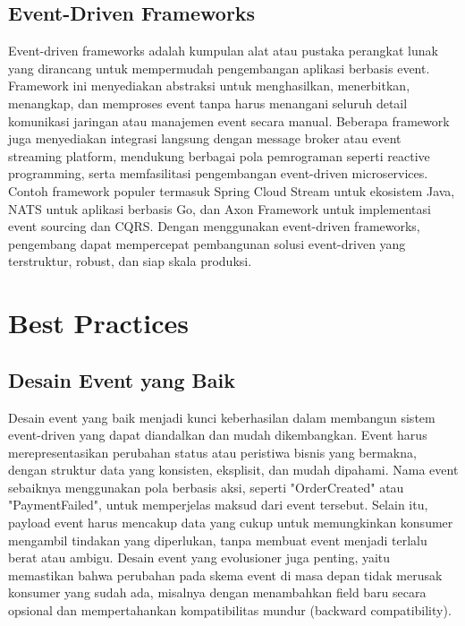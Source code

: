 \subsection{Event-Driven Frameworks}
Event-driven frameworks adalah kumpulan alat atau pustaka perangkat lunak yang dirancang untuk mempermudah pengembangan aplikasi berbasis event. Framework ini menyediakan abstraksi untuk menghasilkan, menerbitkan, menangkap, dan memproses event tanpa harus menangani seluruh detail komunikasi jaringan atau manajemen event secara manual. Beberapa framework juga menyediakan integrasi langsung dengan message broker atau event streaming platform, mendukung berbagai pola pemrograman seperti reactive programming, serta memfasilitasi pengembangan event-driven microservices. Contoh framework populer termasuk Spring Cloud Stream untuk ekosistem Java, NATS untuk aplikasi berbasis Go, dan Axon Framework untuk implementasi event sourcing dan CQRS. Dengan menggunakan event-driven frameworks, pengembang dapat mempercepat pembangunan solusi event-driven yang terstruktur, robust, dan siap skala produksi.


\section{Best Practices}

\subsection{Desain Event yang Baik}
Desain event yang baik menjadi kunci keberhasilan dalam membangun sistem event-driven yang dapat diandalkan dan mudah dikembangkan. Event harus merepresentasikan perubahan status atau peristiwa bisnis yang bermakna, dengan struktur data yang konsisten, eksplisit, dan mudah dipahami. Nama event sebaiknya menggunakan pola berbasis aksi, seperti "OrderCreated" atau "PaymentFailed", untuk memperjelas maksud dari event tersebut. Selain itu, payload event harus mencakup data yang cukup untuk memungkinkan konsumer mengambil tindakan yang diperlukan, tanpa membuat event menjadi terlalu berat atau ambigu. Desain event yang evolusioner juga penting, yaitu memastikan bahwa perubahan pada skema event di masa depan tidak merusak konsumer yang sudah ada, misalnya dengan menambahkan field baru secara opsional dan mempertahankan kompatibilitas mundur (backward compatibility).

